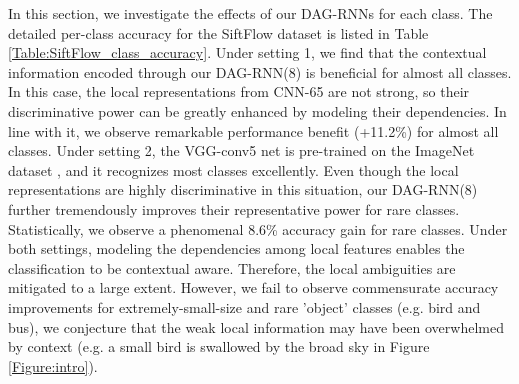 \documentclass[10pt,twocolumn,letterpaper]{article}
\begin{document}
\begin{table*}[t]
\begin{center}
\begin{tabular}{|l|cccccc|cccccccccccccccccccccccc|cc|}
\hline
\end{tabular}
\end{center}
\caption{Per-class accuracy comparison on the SiftFlow dataset. All the numbers are displayed in the percentage scale. The statistics for class frequency is obtained in test images. For reading convenience, the frequent and rare classes are placed in the same block.}
\label{Table:SiftFlow_class_accuracy}
\end{table*}

In this section, we investigate the effects of our DAG-RNNs for each class. The detailed per-class accuracy for the SiftFlow dataset is listed in Table \ref{Table:SiftFlow_class_accuracy}.
Under setting 1, we find that the contextual information encoded through our DAG-RNN(8) is beneficial for almost all classes.
In this case, the local representations from CNN-65 are not strong, so their discriminative power can be greatly enhanced by modeling their dependencies.
In line with it, we observe remarkable performance benefit (+11.2\%) for almost all classes.
Under setting 2, the VGG-conv5 net is pre-trained on the ImageNet dataset \cite{deng2009imagenet}, and it recognizes most classes excellently.
Even though the local representations are highly discriminative in this situation, our DAG-RNN(8) further tremendously improves their representative power for rare classes.
Statistically, we observe a phenomenal 8.6\% accuracy gain for rare classes.
Under both settings, modeling the dependencies among local features enables the classification to be contextual aware.  Therefore, the local ambiguities are mitigated to a large extent.
However, we fail to observe commensurate accuracy improvements for extremely-small-size and rare 'object' classes (e.g. bird and bus), we conjecture that the weak local information may have been overwhelmed by context (e.g. a small bird is swallowed by the broad sky in Figure \ref{Figure:intro}).
\end{document}
